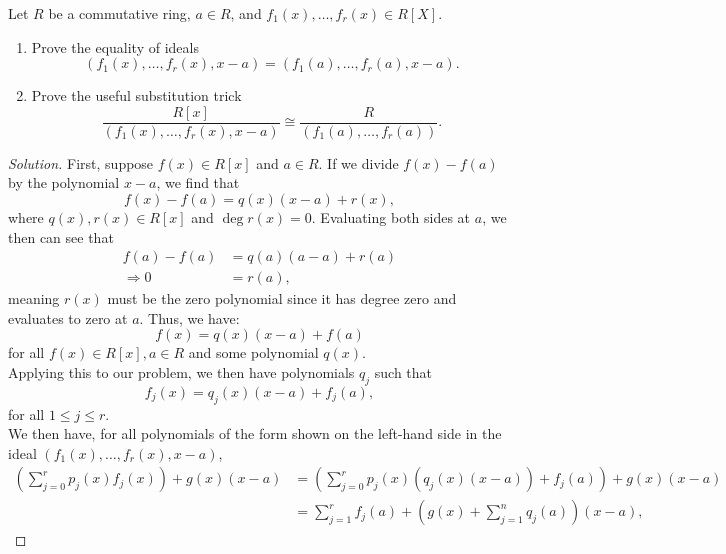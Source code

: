 \documentclass[12pt]{article}
\newenvironment{problem}[2][Problem]{\begin{trivlist}
\item[\hskip \labelsep {\bfseries #1}\hskip \labelsep {\bfseries #2.}]}{\end{trivlist}}
\newenvironment{solution}
  {\renewcommand\qedsymbol{$\blacksquare$}\begin{proof}[Solution]}
{\end{proof}}
\theoremstyle{remark}
\begin{document}
\begin{problem}{4.11}
  Let $R$ be a commutative ring, $a\in R$, and $f_1(x),\dots,f_r(x)\in R[X]$.
  \begin{enumerate}[label=(\alph*)]
    \item Prove the equality of ideals 
      $$\left( f_1(x),\dots,f_r(x),x-a \right) = 
      \left( f_1(a),\dots,f_r(a),x-a \right).$$
    \item Prove the useful substitution trick
      \begin{equation*}
        \frac{R[x]}{\left( f_1(x),\dots,f_r(x),x-a \right)}
        \cong \frac{R}{\left( f_1(a),\dots,f_r(a)\right)}.
      \end{equation*}
  \end{enumerate}
\end{problem}
\begin{solution}
  First, suppose $f(x)\in R[x]$ and $a\in R$.
  If we divide $f(x) - f(a)$ by the polynomial $x-a$, we find that
  \begin{equation*}
    f(x) - f(a) = q(x)(x-a) + r(x),
  \end{equation*}
  where $q(x),r(x)\in R[x]$ and $\deg r(x) = 0$.
  Evaluating both sides at $a$, we then can see that 
  \begin{align*}
    f(a)-f(a) &= q(a)(a-a) + r(a)\\
    \Rightarrow  0 &= r(a),
  \end{align*}
  meaning $r(x)$ must be the zero polynomial since it has degree zero
  and evaluates to zero at $a$.
  Thus, we have:
  \begin{equation*}
    f(x) = q(x)(x-a) + f(a)
  \end{equation*}
  for all $f(x)\in R[x], a\in R$ and some polynomial $q(x)$.\\
  \indent Applying this to our problem, we then have polynomials
  $q_j$ such that
  \begin{equation*}
    f_j(x) = q_j(x)(x-a) + f_j(a),
  \end{equation*}
  for all $1\leq j\leq r$.\\
  \indent We then have, for all polynomials of the form shown on the 
  left-hand side in the ideal
  $\left( f_1(x),\dots,f_r(x),x-a \right)$,
  \begin{align*}
    \left( \sum_{j=0}^r p_j(x)f_j(x) \right) + g(x)(x-a) 
    &=  \left( \sum_{j=0}^r p_j(x)(q_j(x)(x-a)) + f_j(a) \right) + g(x)(x-a)\\
    &= \sum_{j=1}^r f_j(a) 
    + \left( g(x) + \sum_{j=1}^n q_j(a) \right)(x-a),

\end{align*}
\end{solution}
\end{document}
